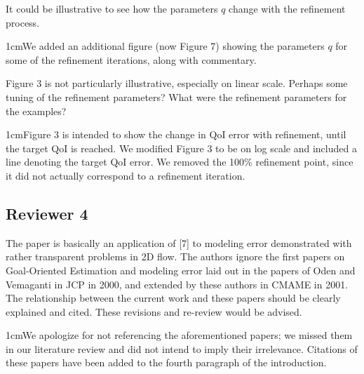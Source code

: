 \documentclass[12pt, letterpaper]{article}
\newcommand{\answer}[1]{\begin{adjustwidth}{1cm}{}{\color{blue}#1}\end{adjustwidth}}
\begin{document}
It could be illustrative to see how the parameters $q$ change with the refinement process.

\answer{We added an additional figure (now Figure 7) showing the parameters $q$ for some of the refinement iterations, along with commentary.}

Figure 3 is not particularly illustrative, especially on linear scale. Perhaps some tuning of the
refinement parameters? What were the refinement parameters for the examples?

\answer{Figure 3 is intended to show the change in QoI error with refinement, until the target QoI is reached. We modified Figure 3 to be on log scale and included a line denoting the target QoI error. We removed the 100\% refinement point, since it did not actually correspond to a refinement iteration.}


\subsection*{Reviewer 4}

The paper is basically an application of [7] to modeling error demonstrated with rather transparent problems in 2D flow. The authors ignore the first papers on Goal-Oriented Estimation and modeling error laid out in the papers of Oden and Vemaganti in JCP in 2000, and extended by these authors in CMAME in 2001. The relationship between the current work and these papers should be clearly explained and cited. These revisions and re-review would be advised.

\answer{We apologize for not referencing the aforementioned papers; we missed them in our literature review and did not intend to imply their irrelevance. Citations of these papers have been added to the fourth paragraph of the introduction.}
\end{document}
